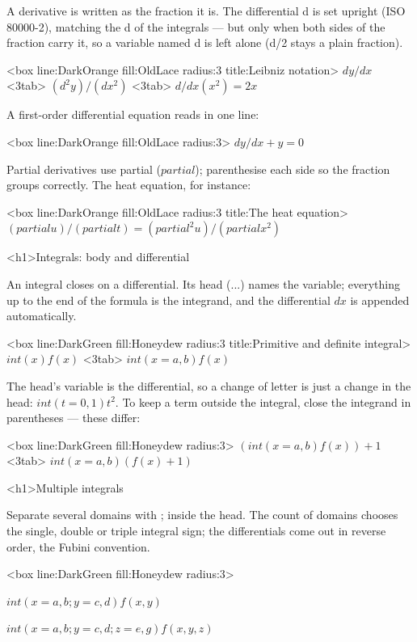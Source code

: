 \documentclass[
  margins=18,
  font=Latin Modern Roman,
  size=12,
  linespread=1.4,
  lang=en
]{scholatex}
\begin{document}
A derivative is written as the fraction it is. The differential d is
set upright (ISO 80000-2), matching the d of the integrals — but only
when both sides of the fraction carry it, so a variable named d is left
alone (d/2 stays a plain fraction).

<box line:DarkOrange fill:OldLace radius:3 title:{Leibniz notation}>{
	$dy/dx$ <3tab> $(d^2 y)/(dx^2)$ <3tab> $d/dx (x^2) = 2x$
}

A first-order differential equation reads in one line:

<box line:DarkOrange fill:OldLace radius:3>{
	$dy/dx + y = 0$
}

Partial derivatives use partial ($partial$); parenthesise each side so
the fraction groups correctly. The heat equation, for instance:

<box line:DarkOrange fill:OldLace radius:3 title:{The heat equation}>{
	$(partial u)/(partial t) = (partial^2 u)/(partial x^2)$
}

<h1>Integrals: body and differential

An integral closes on a differential. Its head (...) names the
variable; everything up to the end of the formula is the integrand, and the
differential $dx$ is appended automatically.

<box line:DarkGreen fill:Honeydew radius:3 title:{Primitive and definite integral}>{
	$int(x) f(x)$ <3tab> $int(x=a, b) f(x)$
}

The head's variable is the differential, so a change of letter is just a
change in the head: $int(t=0, 1) t^2$. To keep a term outside the
integral, close the integrand in parentheses — these differ:

<box line:DarkGreen fill:Honeydew radius:3>{
	$(int(x=a, b) f(x)) + 1$ <3tab> $int(x=a, b) (f(x) + 1)$
}

<h1>Multiple integrals

Separate several domains with ; inside the head. The count of
domains chooses the single, double or triple integral sign; the
differentials come out in reverse order, the Fubini convention.

<box line:DarkGreen fill:Honeydew radius:3>{
	$int(x=a, b ; y=c, d) f(x,y)$

	$int(x=a, b ; y=c, d ; z=e, g) f(x,y,z)$
}
\end{document}
